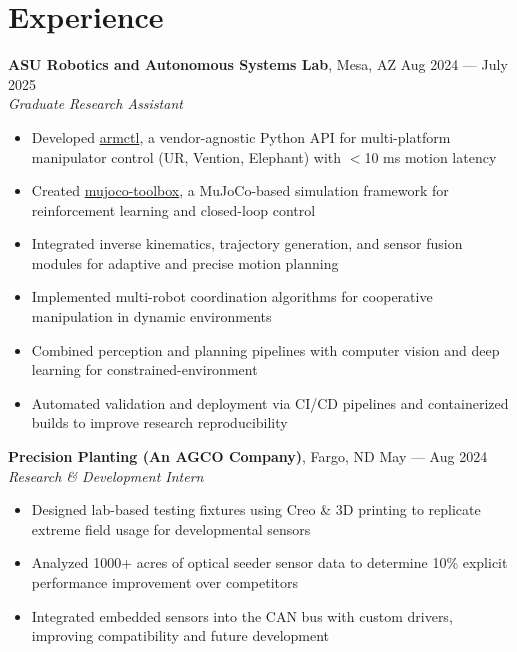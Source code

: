 \documentclass[10pt]{article}
\begin{document}
\section*{Experience}
\textbf{ASU Robotics and Autonomous Systems Lab}, Mesa, AZ \hfill Aug 2024 --- July 2025 \\
\textit{Graduate Research Assistant}
\begin{itemize}
  \item Developed \href{https://github.com/MGross21/armctl}{armctl}, a vendor-agnostic Python API for multi-platform manipulator control (UR, Vention, Elephant) with $<$10 ms motion latency
  \item Created \href{https://github.com/MGross21/mujoco-toolbox}{mujoco-toolbox}, a MuJoCo-based simulation framework for reinforcement learning and closed-loop control
  \item Integrated inverse kinematics, trajectory generation, and sensor fusion modules for adaptive and precise motion planning
  \item Implemented multi-robot coordination algorithms for cooperative manipulation in dynamic environments
  \item Combined perception and planning pipelines with computer vision and deep learning for constrained-environment
  \item Automated validation and deployment via CI/CD pipelines and containerized builds to improve research reproducibility
\end{itemize}
\vspace{0.5em}
\textbf{Precision Planting (An AGCO Company)}, Fargo, ND \hfill May --- Aug 2024 \\
\textit{Research \& Development Intern}
\begin{itemize}
  \item Designed lab-based testing fixtures using Creo \& 3D printing to replicate extreme field usage for developmental sensors
  \item Analyzed 1000+ acres of optical seeder sensor data to determine 10\% explicit performance improvement over competitors
  \item Integrated embedded sensors into the CAN bus with custom drivers, improving compatibility and future development
\end{itemize}
\end{document}
